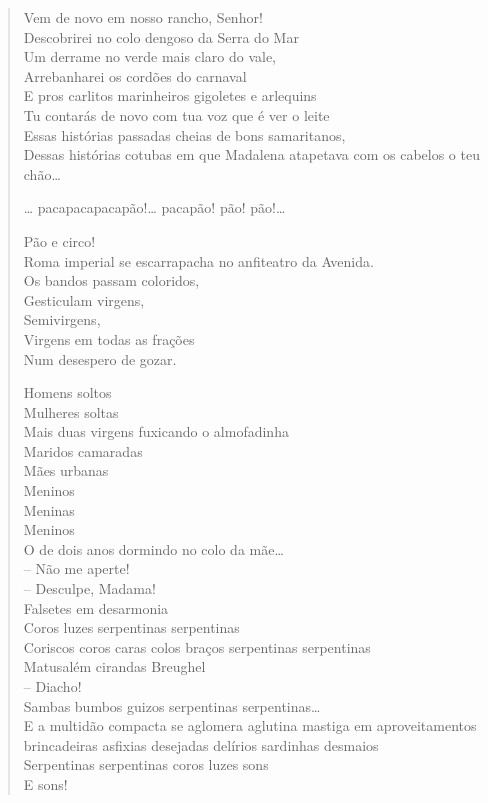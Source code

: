 {\begin{verse}
Vem de novo em nosso rancho, Senhor!\\
Descobrirei no colo dengoso da Serra do Mar\\
Um derrame no verde mais claro do vale,\\
Arrebanharei os cordões do carnaval\\
E pros carlitos marinheiros gigoletes e arlequins\\
Tu contarás de novo com tua voz que é ver o leite\\
Essas histórias passadas cheias de bons samaritanos,\\
Dessas histórias cotubas em que Madalena atapetava com os cabelos o teu chão\ldots{}

\ldots{} pacapacapacapão!\ldots{} pacapão! pão! pão!\ldots{}

Pão e circo!\\
Roma imperial se escarrapacha no anfiteatro da Avenida.\\
Os bandos passam coloridos,\\
Gesticulam virgens,\\
Semivirgens,\\
Virgens em todas as frações\\
Num desespero de gozar.

Homens soltos\\
Mulheres soltas\\
Mais duas virgens fuxicando o almofadinha\\
Maridos camaradas\\
Mães urbanas\\
Meninos\\
Meninas\\
Meninos\\
O de dois anos dormindo no colo da mãe\ldots{}\\
-- Não me aperte!\\
\qquad\qquad -- Desculpe, Madama!\\
Falsetes em desarmonia\\
Coros luzes serpentinas serpentinas\\
Coriscos coros caras colos braços serpentinas serpentinas\\
Matusalém cirandas Breughel\\
\qquad\qquad\qquad\qquad\qquad -- Diacho!\\
Sambas bumbos guizos serpentinas serpentinas\ldots{}\\
E a multidão compacta se aglomera aglutina mastiga em \qb{}aproveitamentos brincadeiras asfixias desejadas delírios sardinhas desmaios\\
Serpentinas serpentinas coros luzes sons\\
E sons!\\


\end{verse}}
